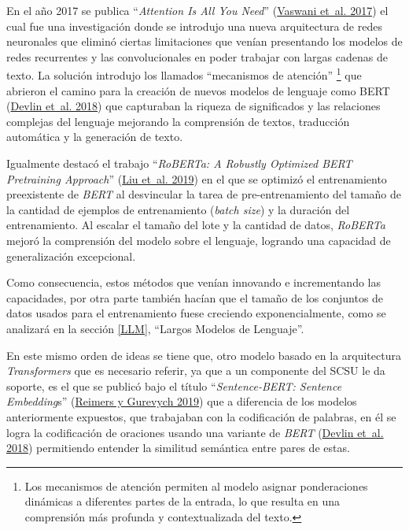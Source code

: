 \documentclass[
  12pt,
  openany]{book}
\begin{document}
En el año 2017 se publica ``\emph{Attention Is All You Need}'' (\protect\hyperlink{ref-vaswani2017}{Vaswani et~al. 2017}) el cual fue una investigación donde se introdujo una nueva arquitectura de redes neuronales que eliminó ciertas limitaciones que venían presentando los modelos de redes recurrentes y las convolucionales en poder trabajar con largas cadenas de texto. La solución introdujo los llamados ``mecanismos de atención'' \footnote{Los mecanismos de atención permiten al modelo asignar ponderaciones dinámicas a diferentes partes de la entrada, lo que resulta en una comprensión más profunda y contextualizada del texto.} que abrieron el camino para la creación de nuevos modelos de lenguaje como BERT (\protect\hyperlink{ref-devlin2018}{Devlin et~al. 2018}) que capturaban la riqueza de significados y las relaciones complejas del lenguaje mejorando la comprensión de textos, traducción automática y la generación de texto.

Igualmente destacó el trabajo ``\emph{RoBERTa: A Robustly Optimized BERT Pretraining Approach}'' (\protect\hyperlink{ref-liu2019}{Liu et~al. 2019}) en el que se optimizó el entrenamiento preexistente de \emph{BERT} al desvincular la tarea de pre-entrenamiento del tamaño de la cantidad de ejemplos de entrenamiento (\emph{batch size}) y la duración del entrenamiento. Al escalar el tamaño del lote y la cantidad de datos, \emph{RoBERTa} mejoró la comprensión del modelo sobre el lenguaje, logrando una capacidad de generalización excepcional.

Como consecuencia, estos métodos que venían innovando e incrementando las capacidades, por otra parte también hacían que el tamaño de los conjuntos de datos usados para el entrenamiento fuese creciendo exponencialmente, como se analizará en la sección \ref{LLM}, ``Largos Modelos de Lenguaje''.

En este mismo orden de ideas se tiene que, otro modelo basado en la arquitectura \emph{Transformers} que es necesario referir, ya que a un componente del SCSU le da soporte, es el que se publicó bajo el título ``\emph{Sentence-BERT: Sentence Embedding}s'' (\protect\hyperlink{ref-reimers2019a}{Reimers y Gurevych 2019}) que a diferencia de los modelos anteriormente expuestos, que trabajaban con la codificación de palabras, en él se logra la codificación de oraciones usando una variante de \emph{BERT} (\protect\hyperlink{ref-devlin2018}{Devlin et~al. 2018}) permitiendo entender la similitud semántica entre pares de estas.
\end{document}
